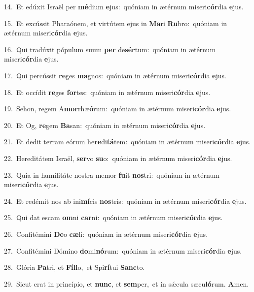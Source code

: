 {\numbfont\textcolor{\numbcolor}{14.}}~Et edúxit Israël per \textbf{mé}\-dium \textbf{e}\-jus:~\star quóniam in ætérnum miseri\-\textbf{cór}\-dia \textbf{e}\-jus.\par
{\numbfont\textcolor{\numbcolor}{15.}}~Et excússit Pharaónem, et virtútem ejus in \textbf{Ma}\-ri \textbf{Ru}\-bro:~\star quóniam in ætérnum miseri\-\textbf{cór}\-dia \textbf{e}\-jus.\par
{\numbfont\textcolor{\numbcolor}{16.}}~Qui tradúxit pópulum suum \textbf{per} de\-\textbf{sér}\-tum:~\star quóniam in ætérnum miseri\-\textbf{cór}\-dia \textbf{e}\-jus.\par
{\numbfont\textcolor{\numbcolor}{17.}}~Qui percússit \textbf{re}\-ges \textbf{ma}\-gnos:~\star quóniam in ætérnum miseri\-\textbf{cór}\-dia \textbf{e}\-jus.\par
{\numbfont\textcolor{\numbcolor}{18.}}~Et occídit \textbf{re}\-ges \textbf{for}\-tes:~\star quóniam in ætérnum miseri\-\textbf{cór}\-dia \textbf{e}\-jus.\par
{\numbfont\textcolor{\numbcolor}{19.}}~Sehon, regem A\-\textbf{mor}\-rhæ\-\textbf{ó}\-rum:~\star quóniam in ætérnum miseri\-\textbf{cór}\-dia \textbf{e}\-jus.\par
{\numbfont\textcolor{\numbcolor}{20.}}~Et Og, \textbf{re}\-gem \textbf{Ba}\-san:~\star quóniam in ætérnum miseri\-\textbf{cór}\-dia \textbf{e}\-jus.\par
{\numbfont\textcolor{\numbcolor}{21.}}~Et dedit terram eórum he\-\textbf{re}\-di\-\textbf{tá}\-tem:~\star quóniam in ætérnum miseri\-\textbf{cór}\-dia \textbf{e}\-jus.\par
{\numbfont\textcolor{\numbcolor}{22.}}~Hereditátem Israël, \textbf{ser}\-vo \textbf{su}\-o:~\star quóniam in ætérnum miseri\-\textbf{cór}\-dia \textbf{e}\-jus.\par
{\numbfont\textcolor{\numbcolor}{23.}}~Quia in humilitáte nostra memor \textbf{fu}\-it \textbf{nos}\-tri:~\star quóniam in ætérnum miseri\-\textbf{cór}\-dia \textbf{e}\-jus.\par
{\numbfont\textcolor{\numbcolor}{24.}}~Et redémit nos ab ini\-\textbf{mí}\-cis \textbf{nos}\-tris:~\star quóniam in ætérnum miseri\-\textbf{cór}\-dia \textbf{e}\-jus.\par
{\numbfont\textcolor{\numbcolor}{25.}}~Qui dat escam \textbf{om}\-ni \textbf{car}\-ni:~\star quóniam in ætérnum miseri\-\textbf{cór}\-dia \textbf{e}\-jus.\par
{\numbfont\textcolor{\numbcolor}{26.}}~Confitémini \textbf{De}\-o \textbf{cæ}\-li:~\star quóniam in ætérnum miseri\-\textbf{cór}\-dia \textbf{e}\-jus.\par
{\numbfont\textcolor{\numbcolor}{27.}}~Confitémini Dómino \textbf{do}\-mi\-\textbf{nó}\-rum:~\star quóniam in ætérnum miseri\-\textbf{cór}\-dia \textbf{e}\-jus.\par
{\numbfont\textcolor{\numbcolor}{28.}}~Glória \textbf{Pa}\-tri, et \textbf{Fí}\-\textbf{li}o,~\star et Spi\-\textbf{rí}\-tui \textbf{Sanc}\-to.\par
{\numbfont\textcolor{\numbcolor}{29.}}~Sicut erat in princípio, et \textbf{nunc}\-, et \textbf{sem}\-per,~\star et in sǽcula sæcu\-\textbf{ló}\-rum. \textbf{A}\-men.\par
